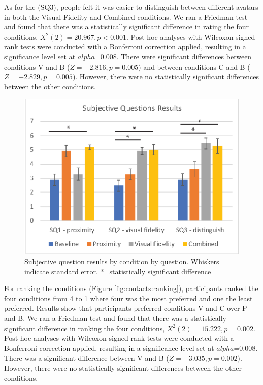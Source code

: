 As for the (SQ3), people felt it was easier to distinguish between different avatars in both the Visual Fidelity and Combined conditions. We ran a Friedman test and found that there was a statistically significant difference in rating the four conditions, $X^2(2)=20.967,p<0.001$. Post hoc analyses with Wilcoxon signed-rank tests were conducted with a Bonferroni correction applied, resulting in a significance level set at $alpha$=0.008. There were significant differences between conditions V and B  ($Z=-2.816, p=0.005$) and between conditions C and B ($Z=-2.829, p=0.005$). However, there were no statistically significant differences between the other conditions.


\begin{figure}[ht]
    \centering
    \includegraphics[width=0.8\linewidth]{images/mgia17/analysis-images-05.eps}
    \caption{Subjective question results by condition by question. Whiskers indicate standard error. *=statistically significant difference}
    \label{fig:contacts:sq2}
\end{figure}

For ranking the conditions (Figure \ref{fig:contacts:ranking}), participants ranked the four conditions from 4 to 1 where four was the most preferred and one the least preferred. Results show that participants preferred conditions V and C over P and B. We ran a Friedman test and found that there was a statistically significant difference in ranking the four conditions, $X^2(2)=15.222,p=0.002$. Post hoc analyses with Wilcoxon signed-rank tests were conducted with a Bonferroni correction applied, resulting in a significance level set at $alpha$=0.008. There was a significant difference between V and B  ($Z=-3.035, p=0.002$). However, there were no statistically significant differences between the other conditions.

